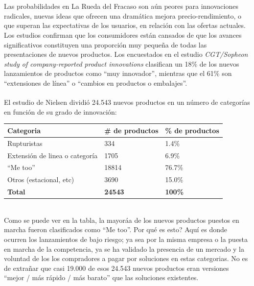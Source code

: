 \documentclass{article}
\begin{document}
\\ \\
Las probabilidades en La Rueda del Fracaso son a\'un peores para innovaciones radicales, nuevas ideas que ofrecen una dram\'atica mejora precio-rendimiento, o que superan las expectativas de los usuarios, en relaci\'on con las ofertas actuales. Los estudios confirman que los consumidores est\'an cansados de que los avances significativos constituyen una proporci\'on muy peque\~na de todas las presentaciones de nuevos productos. Los encuestados en el estudio \textit{CGT/Sopheon study of company-reported product innovations} clasifican un 18\% de los nuevos lanzamientos de productos como ``muy innovador'', mientras que el 61\% son ``extensiones de l\'inea'' o ``cambios en productos o embalajes''.
\\ \\
El estudio de Nielsen dividi\'o 24.543 nuevos productos en un n\'umero de categor\'ias en funci\'on de su grado de innovaci\'on:
\begin{table}[h]
\centering
    \begin{tabular}{|l|l|l|}
    \hline
    \textbf{Categoria}                      & \textbf{\# de productos} & \textbf{\% de productos} \\ \hline
    Rupturistas                    & 334                 & 1.4\%                   \\ \hline
    Extensi\'on de linea o categor\'ia & 1705                & 6.9\%                   \\ \hline
    ``Me too''                       & 18814               & 76.7\%                  \\ \hline
    Otros (estacional, etc)        & 3690                & 15.0\%                  \\ \hline
    \textbf{Total}                          & \textbf{24543}               & \textbf{100\%}                   \\ \hline
    \end{tabular}
\end{table}
\\
Como se puede ver en la tabla, la mayor\'aa de los nuevos productos puestos en marcha fueron clasificados como ``Me too''. Por qu\'e es esto? Aqu\'i es donde ocurren los lanzamientos de bajo riesgo; ya sea por la misma empresa o la puesta en marcha de la competencia, ya se ha validado la presencia de un mercado y la voluntad de los los compradores a pagar por soluciones en estas categorias. No es de extra\~nar que casi 19.000 de esos 24.543 nuevos productos eran versiones ``mejor / m\'as r\'apido / m\'as barato'' que las soluciones existentes.
\end{document}
